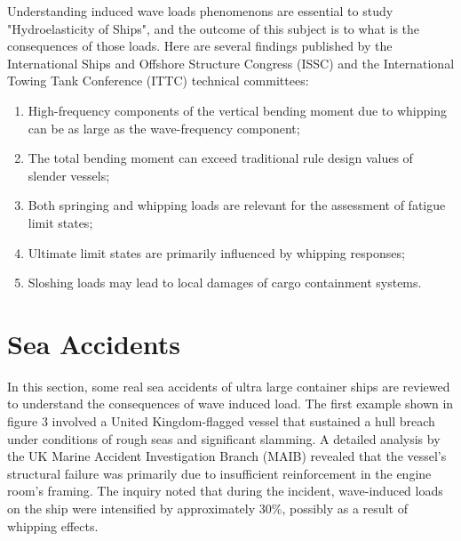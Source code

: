 \documentclass[12pt]{article} %
\begin{document}
Understanding induced wave loads phenomenons are essential to study "Hydroelasticity of Ships", and the outcome of this subject is to what is the consequences of 
those loads. Here are several findings 
published by the International Ships and Offshore Structure Congress (ISSC) and the International Towing Tank Conference (ITTC) 
technical committees\cite{1}: 
\begin{enumerate}
    \item High-frequency components of the vertical bending moment due to whipping 
    can be as large as the wave-frequency component; 
    \item The total bending moment can exceed traditional rule design values of 
    slender vessels; 
    \item Both springing and whipping loads are relevant for the assessment of fatigue limit states; 
    \item Ultimate limit states are primarily influenced by whipping responses; 
    \item Sloshing loads may lead to local damages of cargo containment 
    systems. 
\end{enumerate}

\section{Sea Accidents}
In this section, some real sea accidents of ultra large container ships are reviewed to understand the consequences of wave induced load. The first example shown in figure 3 involved a United Kingdom-flagged vessel 
that sustained a hull breach under conditions of rough seas and significant slamming. A detailed analysis by the UK Marine Accident Investigation Branch (MAIB) revealed that the vessel's 
structural failure was primarily due to insufficient reinforcement in the engine room's framing. The inquiry noted that during the incident, wave-induced loads on the ship were intensified by 
approximately 30\%, possibly as a result of whipping effects.
\end{document}
